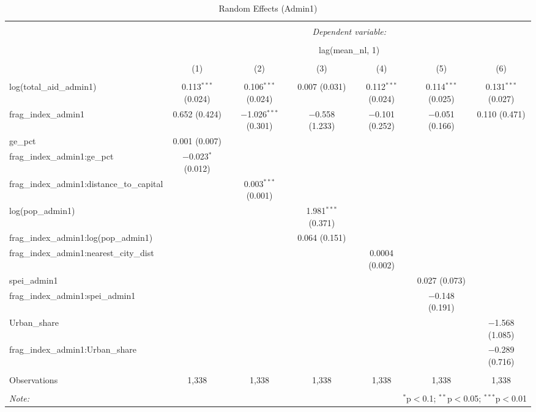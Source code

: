 
\begin{table}[!htbp] \centering 
  \caption{Random Effects (Admin1)} 
  \label{} 
\begin{tabular}{@{\extracolsep{5pt}}lcccccc} 
\\[-1.8ex]\hline 
\hline \\[-1.8ex] 
 & \multicolumn{6}{c}{\textit{Dependent variable:}} \\ 
\cline{2-7} 
\\[-1.8ex] & \multicolumn{6}{c}{lag(mean\_nl, 1)} \\ 
\\[-1.8ex] & (1) & (2) & (3) & (4) & (5) & (6)\\ 
\hline \\[-1.8ex] 
 log(total\_aid\_admin1) & 0.113$^{***}$ (0.024) & 0.106$^{***}$ (0.024) & 0.007 (0.031) & 0.112$^{***}$ (0.024) & 0.114$^{***}$ (0.025) & 0.131$^{***}$ (0.027) \\ 
  frag\_index\_admin1 & 0.652 (0.424) & $-$1.026$^{***}$ (0.301) & $-$0.558 (1.233) & $-$0.101 (0.252) & $-$0.051 (0.166) & 0.110 (0.471) \\ 
  ge\_pct & 0.001 (0.007) &  &  &  &  &  \\ 
  frag\_index\_admin1:ge\_pct & $-$0.023$^{*}$ (0.012) &  &  &  &  &  \\ 
  frag\_index\_admin1:distance\_to\_capital &  & 0.003$^{***}$ (0.001) &  &  &  &  \\ 
  log(pop\_admin1) &  &  & 1.981$^{***}$ (0.371) &  &  &  \\ 
  frag\_index\_admin1:log(pop\_admin1) &  &  & 0.064 (0.151) &  &  &  \\ 
  frag\_index\_admin1:nearest\_city\_dist &  &  &  & 0.0004 (0.002) &  &  \\ 
  spei\_admin1 &  &  &  &  & 0.027 (0.073) &  \\ 
  frag\_index\_admin1:spei\_admin1 &  &  &  &  & $-$0.148 (0.191) &  \\ 
  Urban\_share &  &  &  &  &  & $-$1.568 (1.085) \\ 
  frag\_index\_admin1:Urban\_share &  &  &  &  &  & $-$0.289 (0.716) \\ 
 \hline \\[-1.8ex] 
Observations & 1,338 & 1,338 & 1,338 & 1,338 & 1,338 & 1,338 \\ 
\hline 
\hline \\[-1.8ex] 
\textit{Note:}  & \multicolumn{6}{r}{$^{*}$p$<$0.1; $^{**}$p$<$0.05; $^{***}$p$<$0.01} \\ 
\end{tabular} 
\end{table} 

